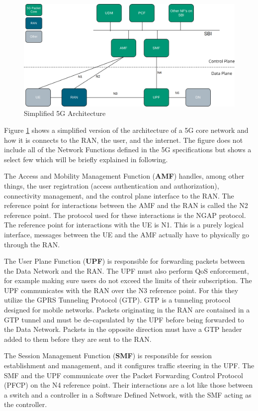\begin{figure}[ht]
    \centering
	\includegraphics[width=\linewidth]{fig/core.png}
	\caption{Simplified 5G Architecture}
	\label{fig:core}
\end{figure} 

Figure \ref{fig:core} shows a simplified version of the architecture of a 5G core network and how it is connects to the RAN, the user, and the internet. The figure does not include all of the Network Functions defined in the 5G specifications but shows a select few which will be briefly explained in following.

The Access and Mobility Management Function (\textbf{AMF}) handles, among other things, the user registration (access authentication and authorization), connectivity management, and the control plane interface to the RAN. The reference point for interactions between the AMF and the RAN is called the N2 reference point. The protocol used for these interactions is the NGAP protocol. The reference point for interactions with the UE is N1. This is a purely logical interface, messages between the UE and the AMF actually have to physically go through the RAN.

The User Plane Function (\textbf{UPF}) is responsible for forwarding packets between the Data Network and the RAN. The UPF must also perform QoS enforcement, for example making sure users do not exceed the limits of their subscription. The UPF communicates with the RAN over the N3 reference point. For this they utilize the GPRS Tunneling Protocol (GTP). GTP is a tunneling protocol designed for mobile networks. Packets originating in the RAN are contained in a GTP tunnel and must be de-capsulated by the UPF before being forwarded to the Data Network. Packets in the opposite direction must have a GTP header added to them before they are sent to the RAN.

The Session Management Function (\textbf{SMF}) is responsible for session establishment and management, and it configures traffic steering in the UPF. The SMF and the UPF communicate over the Packet Forwarding Control Protocol (PFCP) on the N4 reference point. Their interactions are a lot like those between a switch and a controller in a Software Defined Network, with the SMF acting as the controller.

